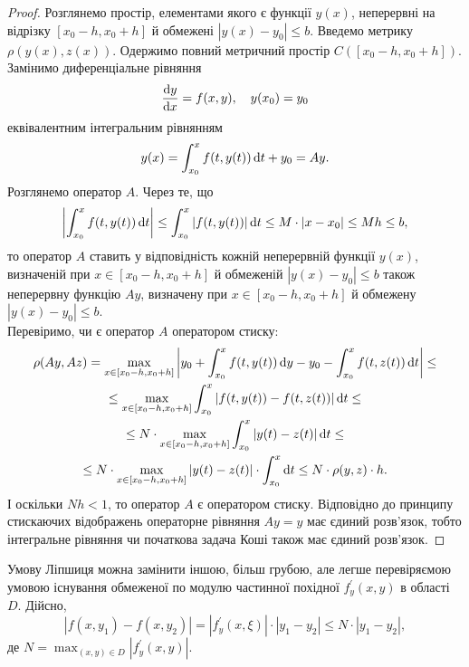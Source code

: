 \begin{proof}
	Розглянемо простір, елементами якого є функції $y(x)$, неперервні на відрізку $[x_0 - h, x_0 + h]$ й обмежені $|y(x) - y_0| \le b$. Введемо метрику $\rho(y(x), z(x))$. Одержимо повний метричний простір $C([x_0 - h, x_0 + h])$. Замінимо диференціальне рівняння
	\begin{equation*}
		\frac{\mathop{}\!\mathrm{d} y}{\mathop{}\!\mathrm{d} x} = f(x, y), \quad y(x_0) = y_0
	\end{equation*}
	еквівалентним інтегральним рівнянням
	\begin{equation*}
		y(x) = \int_{x_0}^x f(t, y(t)) \mathop{}\!\mathrm{d} t + y_0 = A y.
	\end{equation*}
	Розглянемо оператор $A$. Через те, що  
	\begin{equation*}
		\left|\int_{x_0}^x f(t, y(t)) \mathop{}\!\mathrm{d} t \right| \le \int_{x_0}^x |f(t, y(t))| \mathop{}\!\mathrm{d} t \le M \cdot |x-x_0| \le Mh \le b,
	\end{equation*}
	то оператор $A$ ставить у відповідність кожній неперервній функції $y(x)$, визначеній при $x\in[x_0 - h, x_0 + h]$ й обмеженій $|y(x)-y_0|\le b$ також неперервну функцію $Ay$,  визначену при $x\in[x_0 - h, x_0 + h]$ й обмежену $|y(x)-y_0|\le b$. \\

	Перевіримо, чи є оператор $A$ оператором стиску:
	\begin{multline}
		\rho(Ay, Az) = \max_{x \in[x_0-h,x_0+h]} \left|y_0 + \int_{x_0}^x f(t, y(t)) \mathop{}\!\mathrm{d} y - y_0 - \int_{x_0}^x f(t, z(t)) \mathop{}\!\mathrm{d} t\right| \le \\
		\le \max_{x \in[x_0-h,x_0+h]} \int_{x_0}^x |f(t, y(t)) - f(t, z(t))| \mathop{}\!\mathrm{d} t \le \\
		\le N \cdot \max_{x \in[x_0-h,x_0+h]} \int_{x_0}^x |y(t) - z(t)| \mathop{}\!\mathrm{d} t \le \\
		\le N \cdot \max_{x \in[x_0-h,x_0+h]} |y(t) - z(t)| \cdot \int_{x_0}^x \mathop{}\!\mathrm{d} t \le N \cdot \rho(y, z) \cdot h.
	\end{multline}
	І оскільки $Nh < 1$, то оператор $A$ є оператором стиску. Відповідно до принципу стискаючих відображень операторне рівняння $Ay=y$ має єдиний розв’язок, тобто інтегральне рівняння чи початкова задача Коші також має єдиний розв’язок.
\end{proof}

\begin{remark}
	Умову Ліпшиця можна замінити іншою, більш грубою, але легше перевіряємою умовою існування обмеженої по модулю частинної похідної $f_y^\prime (x,y)$ в області $D$. Дійсно,
	\begin{equation*}
		|f(x,y_1)-f(x,y_2)|=|f_y^\prime(x,\xi)|\cdot|y_1-y_2|\le N\cdot|y_1-y_2|,
	\end{equation*}
	де $N = \max_{(x,y)\in D} |f_y^\prime(x,y)|$.
\end{remark}

